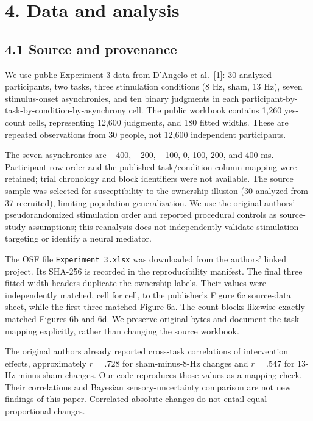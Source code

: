 \documentclass[
  11pt,
]{article}
\let\ctdoldsection\section
\renewcommand{\section}{\Needspace{8\baselineskip}\ctdoldsection}
\let\ctdoldsubsection\subsection
\renewcommand{\subsection}{\Needspace{6\baselineskip}\ctdoldsubsection}
\begin{document}
\hypertarget{data-and-analysis}{%
\section{4. Data and analysis}\label{data-and-analysis}}

\hypertarget{source-and-provenance}{%
\subsection{4.1 Source and provenance}\label{source-and-provenance}}

We use public Experiment 3 data from D'Angelo et al.~{[}1{]}: 30
analyzed participants, two tasks, three stimulation conditions (8 Hz,
sham, 13 Hz), seven stimulus-onset asynchronies, and ten binary
judgments in each participant-by-task-by-condition-by-asynchrony cell.
The public workbook contains 1,260 yes-count cells, representing 12,600
judgments, and 180 fitted widths. These are repeated observations from
30 people, not 12,600 independent participants.

The seven asynchronies are −400, −200, −100, 0, 100, 200, and 400 ms.
Participant row order and the published task/condition column mapping
were retained; trial chronology and block identifiers were not
available. The source sample was selected for susceptibility to the
ownership illusion (30 analyzed from 37 recruited), limiting population
generalization. We use the original authors' pseudorandomized
stimulation order and reported procedural controls as source-study
assumptions; this reanalysis does not independently validate stimulation
targeting or identify a neural mediator.

The OSF file \texttt{Experiment\_3.xlsx} was downloaded from the
authors' linked project. Its SHA-256 is recorded in the reproducibility
manifest. The final three fitted-width headers duplicate the ownership
labels. Their values were independently matched, cell for cell, to the
publisher's Figure 6c source-data sheet, while the first three matched
Figure 6a. The count blocks likewise exactly matched Figures 6b and 6d.
We preserve original bytes and document the task mapping explicitly,
rather than changing the source workbook.

The original authors already reported cross-task correlations of
intervention effects, approximately \(r=.728\) for sham-minus-8-Hz
changes and \(r=.547\) for 13-Hz-minus-sham changes. Our code reproduces
those values as a mapping check. Their correlations and Bayesian
sensory-uncertainty comparison are not new findings of this paper.
Correlated absolute changes do not entail equal proportional changes.
\end{document}
